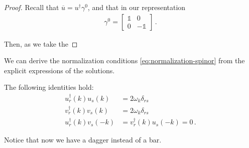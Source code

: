 \documentclass[main.tex]{subfiles}
\begin{document}
\begin{proof}
Recall that \(\overline{u} = u ^\dag \gamma^{0}\), and that in our representation 
%
\begin{align}
\gamma^{0} = \left[\begin{array}{cc}
\mathbb{1} & 0 \\ 
0 & -\mathbb{1}
\end{array}\right]
\,.
\end{align}

Then, as we take the 
\end{proof}


\begin{claim}
We can derive the normalization conditions \eqref{eq:normalization-spinor} from the explicit expressions of the solutions.
\end{claim}

\begin{claim}
The following identities hold:
%
\begin{align} 
u_{r}^\dag (k) u_{s}(k) &= 2 \omega_{k}\delta_{rs}  \\
v_{r}^\dag (k) v_{s}(k) &= 2 \omega_{k} \delta_{rs}  \\
u_{r}^\dag (k) v_{s}(-k) &=   
v_{r}^\dag (k) u_{s}(-k) = 0  
\,.
\end{align}

Notice that now we have a dagger instead of a bar.
\end{claim}
\end{document}
